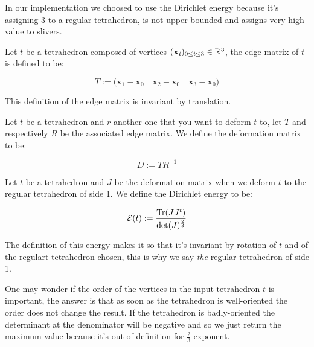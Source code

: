 \documentclass[11pt]{article}
\begin{document}


In our implementation we choosed to use the Dirichlet energy because it's assigning 3 to a regular tetrahedron,
is not upper bounded and assigns very high value to slivers.

\begin{definition}

	Let $t$ be a tetrahedron composed of vertices $(\mathbf{x}_i)_{0\leq i\leq 3}\in\mathbb{R}^{3}$, the edge matrix of
	$t$ is defined to be:

	$$T := \biggl( \mathbf{x}_1 - \mathbf{x}_0\quad \mathbf{x}_2 - \mathbf{x}_0\quad \mathbf{x}_3 -
		\mathbf{x}_0\biggr)$$

\end{definition}

\begin{remark}

	This definition of the edge matrix is invariant by translation.

\end{remark}

\begin{definition}

	Let $t$ be a tetrahedron and $r$ another one that you want to deform $t$ to, let $T$ and respectively $R$
	be the associated edge matrix. We define the deformation matrix to be:

	$$D := TR^{-1}$$

\end{definition}

\begin{definition}

	Let $t$ be a tetrahedron and $J$ be the deformation matrix when we deform $t$ to the regular tetrahedron of
	side 1. We define the Dirichlet energy to be:

	$$\mathcal{E}(t) := \frac{\mathrm{Tr}(JJ^{t})}{\det(J)^{\frac{2}{3}}}$$

\end{definition}

\begin{remark}

	The definition of this energy makes it so that it's invariant by rotation of $t$ and of the regulart
	tetrahedron chosen, this is why we say \emph{the} regular tetrahedron of side 1.

\end{remark}

\begin{remark}

	One may wonder if the order of the vertices in the input tetrahedron $t$ is important, the answer is that
	as soon as the tetrahedron is well-oriented the order does not change the result. If the
	tetrahedron is badly-oriented the determinant at the denominator will be negative and so we just return the
	maximum value because it's out of definition for $\frac{2}{3}$ exponent.

\end{remark}
\end{document}
